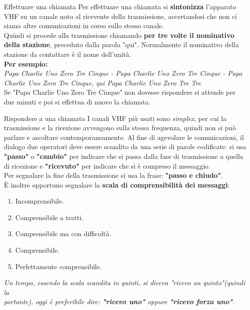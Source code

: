 \documentclass[aspectratio=169]{beamer}
\begin{document}
\begin{frame}{Effettuare una chiamata}
	Per effettuare una chiamata si \textbf{sintonizza} l'apparato VHF su un canale noto al ricevente della trasmissione, accertandosi che non ci siamo altre comunicazioni in corso sullo stesso canale.\\
	\smallskip
	Quindi si procede alla trasmissione chiamando \textbf{per tre volte il nominativo della stazione}, preceduto dalla parola "qui". Normalmente il nominativo della stazione da contattare è il nome dell'unità.\\
	\medskip
	\textbf{Per esempio:}\\
	\emph{Papa Charlie Uno Zero Tre Cinque - Papa Charlie Uno Zero Tre Cinque - Papa Charlie Uno Zero Tre Cinque, qui Papa Charlie Uno Zero Tre Tre}\\
	\smallskip
	Se "Papa Charlie Uno Zero Tre Cinque" non dovesse rispondere si attende per due minuti e poi si effettua di nuovo la chiamata.
\end{frame}

\begin{frame}{Rispondere a una chiamata}
I canali VHF più usati sono \emph{simplex}, per cui la trasmissione e la ricezione avvengono sulla stessa frequenza, quindi non si può parlare e ascoltare contemporaneamente.
\smallskip
Al fine di agevolare le comunicazioni,  il dialogo due operatori deve essere scandito da una serie di parole codificate: si usa \textbf{"passo"} o \textbf{"cambio"} per indicare che si passa dalla fase di trasmissione a quella di ricezione e \textbf{"ricevuto"} per indicare che si è compreso il messaggio.\\
Per segnalare la fine della trasmissione si usa la frase: \textbf{"passo e chiudo"}.\\
\smallskip
È inoltre opportuno segnalare la \textbf{scala di comprensibilità dei messaggi}:\\
\begin{enumerate}
	\item Incomprensibile.
	\item Comprensibile a tratti.
	\item Comprensibile ma con difficoltà.
	\item Comprensibile.
	\item Perfettamente comprensibile.
\end{enumerate}
\smallskip
\emph{Un tempo, essendo la scala scandita in quinti, si diceva "ricevo un quinto"(quindi la \\portante), oggi è preferibile dire: \textbf{"ricevo uno"} oppure \textbf{"ricevo forza uno"}.}
\end{frame}
\end{document}
